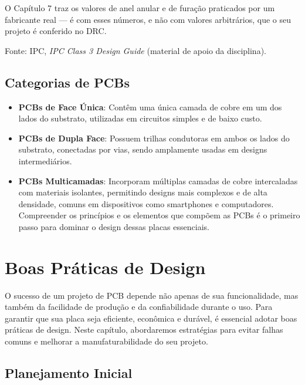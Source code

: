 O Capítulo 7 traz os valores de anel anular e de furação praticados por um fabricante real --- é com esses números, e não com valores arbitrários, que o seu projeto é conferido no DRC.

Fonte: IPC, \emph{IPC Class 3 Design Guide} (material de apoio da disciplina).

\hypertarget{categorias-de-pcbs}{%
\section{Categorias de PCBs}\label{categorias-de-pcbs}}

\begin{itemize}
\tightlist
\item
  \textbf{PCBs de Face Única}: Contêm uma única camada de cobre em um dos lados do substrato, utilizadas em circuitos simples e de baixo custo.
\item
  \textbf{PCBs de Dupla Face}: Possuem trilhas condutoras em ambos os lados do substrato, conectadas por vias, sendo amplamente usadas em designs intermediários.
\item
  \textbf{PCBs Multicamadas}: Incorporam múltiplas camadas de cobre intercaladas com materiais isolantes, permitindo designs mais complexos e de alta densidade, comuns em dispositivos como smartphones e computadores. Compreender os princípios e os elementos que compõem as PCBs é o primeiro
  passo para dominar o design dessas placas essenciais.
\end{itemize}

\hypertarget{boas-pruxe1ticas-de-design}{%
\chapter{Boas Práticas de Design}\label{boas-pruxe1ticas-de-design}}

O sucesso de um projeto de PCB depende não apenas de sua funcionalidade, mas também da facilidade de produção e da confiabilidade durante o uso. Para garantir que sua placa seja eficiente, econômica e durável, é essencial adotar boas práticas de design. Neste capítulo, abordaremos estratégias para evitar falhas comuns e melhorar a manufaturabilidade do seu projeto.

\hypertarget{planejamento-inicial}{%
\section{Planejamento Inicial}\label{planejamento-inicial}}

